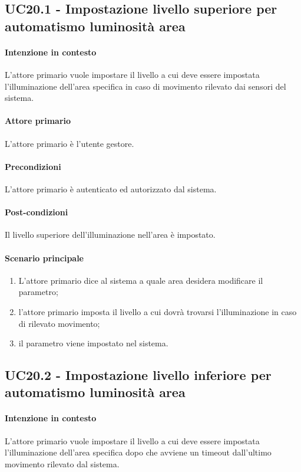 \subsection{UC20.1 - Impostazione livello superiore per automatismo luminosità area}\label{uc:20.1}
\paragraph{Intenzione in contesto} L'attore primario vuole impostare il livello a cui deve essere impostata l'illuminazione dell'area specifica in caso di movimento rilevato dai sensori del sistema.
\paragraph{Attore primario} L'attore primario è l'utente gestore.
\paragraph{Precondizioni} L'attore primario è autenticato ed autorizzato dal sistema.
\paragraph{Post-condizioni} Il livello superiore dell'illuminazione nell'area è impostato.
\paragraph{Scenario principale}
\begin{enumerate}
    \item L'attore primario dice al sistema a quale area desidera modificare il parametro;
    \item l'attore primario imposta il livello a cui dovrà trovarsi l'illuminazione in caso di rilevato movimento;
    \item il parametro viene impostato nel sistema.
\end{enumerate}

\subsection{UC20.2 - Impostazione livello inferiore per automatismo luminosità area}\label{uc:20.2}

\paragraph{Intenzione in contesto} L'attore primario vuole impostare il livello a cui deve essere impostata l'illuminazione dell'area specifica dopo che avviene un timeout dall'ultimo movimento rilevato dal sistema.
